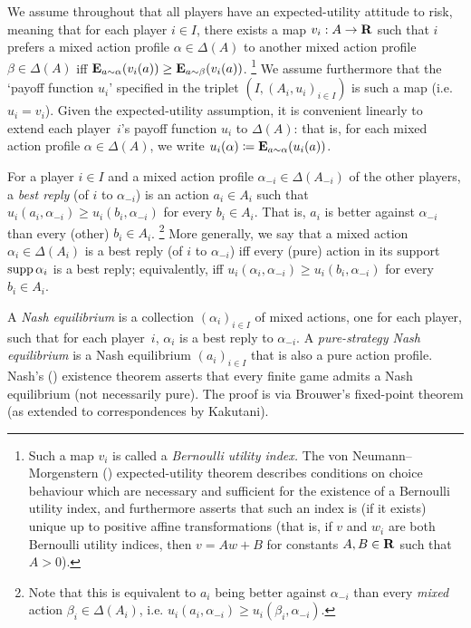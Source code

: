 \documentclass[11pt,letterpaper,reqno,oneside]{book}
\begin{document}
We assume throughout that all players have an expected-utility attitude to risk, meaning that for each player $i \in I$, there exists a map $v_i : A \to \mathbf{R}$ such that $i$ prefers a mixed action profile $\alpha \in \Delta(A)$ to another mixed action profile $\beta \in \Delta(A)$ iff $\mathbf{E}_{a \sim \alpha}( v_i(a) ) \geq \mathbf{E}_{a \sim \beta}( v_i(a) )$.%
	\footnote{Such a map $v_i$ is called a \emph{Bernoulli utility index.} The von Neumann--Morgenstern (\citeyear{VonneumannMorgenstern1947}) expected-utility theorem describes conditions on choice behaviour which are necessary and sufficient for the existence of a Bernoulli utility index, and furthermore asserts that such an index is (if it exists) unique up to positive affine transformations (that is, if $v$ and $w_i$ are both Bernoulli utility indices, then $v = A w + B$ for constants $A,B \in \mathbf{R}$ such that $A>0$).}
We assume furthermore that the `payoff function $u_i$' specified in the triplet $\left( I, (A_i, u_i)_{i \in I} \right)$ is such a map (i.e. $u_i=v_i$). Given the expected-utility assumption, it is convenient linearly to extend each player~$i$'s payoff function $u_i$ to $\Delta(A)$: that is, for each mixed action profile $\alpha \in \Delta(A)$, we write $u_i(\alpha) \coloneqq \E_{a \sim \alpha}\left( u_i(a) \right)$.

For a player $i \in I$ and a mixed action profile $\alpha_{-i} \in \Delta(A_{-i})$ of the other players, a \emph{best reply} (of $i$ to $\alpha_{-i}$) is an action $a_i \in A_i$ such that $u_i(a_i,\alpha_{-i}) \geq u_i(b_i,\alpha_{-i})$ for every $b_i \in A_i$.
That is, $a_i$ is better against $\alpha_{-i}$ than every (other) $b_i \in A_i$.%
	\footnote{Note that this is equivalent to $a_i$ being better against $\alpha_{-i}$ than every \emph{mixed} action $\beta_i \in \Delta(A_i)$, i.e. $u_i(a_i,\alpha_{-i}) \geq u_i(\beta_i,\alpha_{-i})$.}
More generally, we say that a mixed action $\alpha_i \in \Delta(A_i)$ is a best reply (of $i$ to $\alpha_{-i}$) iff every (pure) action in its support $\operatorname*{supp} \alpha_i$ is a best reply; equivalently, iff $u_i(\alpha_i,\alpha_{-i}) \geq u_i(b_i,\alpha_{-i})$ for every $b_i \in A_i$.

A \emph{Nash equilibrium} is a collection $(\alpha_i)_{i \in I}$ of mixed actions, one for each player, such that for each player~$i$, $\alpha_i$ is a best reply to $\alpha_{-i}$. A \emph{pure-strategy Nash equilibrium} is a Nash equilibrium $(a_i)_{i \in I}$ that is also a pure action profile. Nash's (\citeyear{Nash1950,Nash1951}) existence theorem asserts that every finite game admits a Nash equilibrium (not necessarily pure). The proof is via Brouwer's fixed-point theorem (as extended to correspondences by Kakutani).
\end{document}
